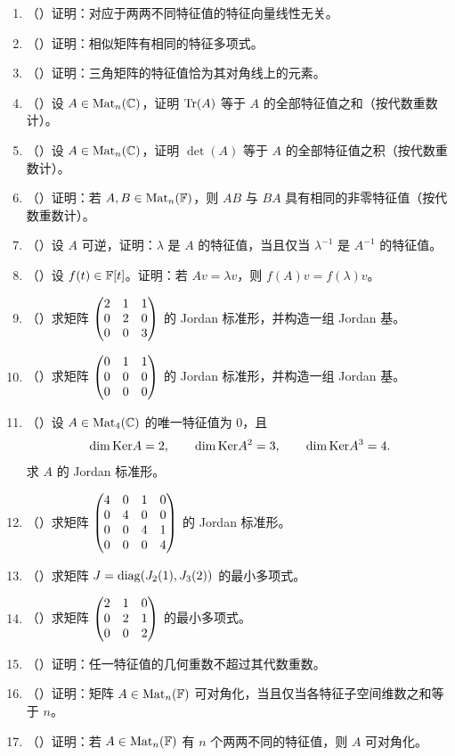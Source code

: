 \begin{enumerate}[label=\arabic*., leftmargin=2.8em, resume]
  \item （\medium）证明：对应于两两不同特征值的特征向量线性无关。
  \item （\medium）证明：相似矩阵有相同的特征多项式。
  \item （\medium）证明：三角矩阵的特征值恰为其对角线上的元素。
  \item （\medium）设 \(A\in \mathrm{Mat}_n(\mathbb{C})\)，证明 \(\mathrm{Tr}(A)\) 等于 \(A\) 的全部特征值之和（按代数重数计）。
  \item （\medium）设 \(A\in \mathrm{Mat}_n(\mathbb{C})\)，证明 \(\det(A)\) 等于 \(A\) 的全部特征值之积（按代数重数计）。
  \item （\medium）证明：若 \(A,B\in \mathrm{Mat}_n(\mathbb{F})\)，则 \(AB\) 与 \(BA\) 具有相同的非零特征值（按代数重数计）。
  \item （\medium）设 \(A\) 可逆，证明：\(\lambda\) 是 \(A\) 的特征值，当且仅当 \(\lambda^{-1}\) 是 \(A^{-1}\) 的特征值。
  \item （\medium）设 \(f(t)\in \mathbb{F}[t]\)。证明：若 \(Av=\lambda v\)，则 \(f(A)v=f(\lambda)v\)。
  \item （\medium）求矩阵 \(\begin{pmatrix} 2&1&1\\0&2&0\\0&0&3 \end{pmatrix}\) 的 Jordan 标准形，并构造一组 Jordan 基。
  \item （\medium）求矩阵 \(\begin{pmatrix} 0&1&1\\0&0&0\\0&0&0 \end{pmatrix}\) 的 Jordan 标准形，并构造一组 Jordan 基。
  \item （\medium）设 \(A\in \mathrm{Mat}_4(\mathbb{C})\) 的唯一特征值为 \(0\)，且
  \[
  \dim\mathrm{Ker} A=2,\qquad \dim\mathrm{Ker} A^2=3,\qquad \dim\mathrm{Ker} A^3=4.
  \]
  求 \(A\) 的 Jordan 标准形。
  \item （\medium）求矩阵 \(\begin{pmatrix} 4&0&1&0\\0&4&0&0\\0&0&4&1\\0&0&0&4 \end{pmatrix}\) 的 Jordan 标准形。
  \item （\medium）求矩阵 \(J=\mathrm{diag}(J_2(1),J_3(2))\) 的最小多项式。
  \item （\medium）求矩阵 \(\begin{pmatrix} 2&1&0\\0&2&1\\0&0&2 \end{pmatrix}\) 的最小多项式。
  \item （\medium）证明：任一特征值的几何重数不超过其代数重数。
  \item （\medium）证明：矩阵 \(A\in \mathrm{Mat}_n(\mathbb{F})\) 可对角化，当且仅当各特征子空间维数之和等于 \(n\)。
  \item （\medium）证明：若 \(A\in \mathrm{Mat}_n(\mathbb{F})\) 有 \(n\) 个两两不同的特征值，则 \(A\) 可对角化。

\end{enumerate}
